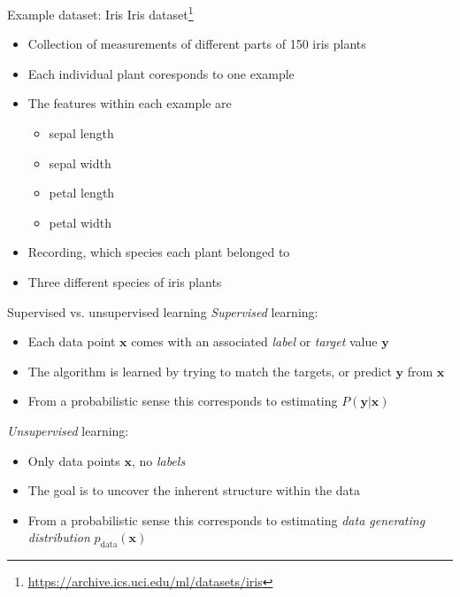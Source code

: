 \documentclass[dvipsnames]{beamer}
\begin{document}
	\def\footnoterule{\only<1->\oldfootnoterule}
	\begin{frame}{Example dataset: Iris}
		Iris dataset\footnote{\url{https://archive.ics.uci.edu/ml/datasets/iris}} \pause
		\begin{itemize}
			\item Collection of measurements of different parts of 150 iris plants\pause
			\item Each individual plant coresponds to one example \pause
			\item The features within each example are\pause
			\begin{itemize}
				\item sepal length
				\item sepal width
				\item petal length
				\item petal width \pause
			\end{itemize}
			\item Recording, which species each plant belonged to \pause
			\item Three different species of iris plants
		\end{itemize}
    \end{frame}
		
		\begin{frame}{Supervised vs. unsupervised learning}
			\emph{Supervised} learning:
			\begin{itemize}
				\item Each data point $\mathbf{x}$ comes with an associated \emph{label} or \emph{target} value $\mathbf{y}$
				\item The algorithm is learned by trying to match the targets, or predict $\mathbf{y}$ from $\mathbf{x}$
				\item From a probabilistic sense this corresponds to estimating $P(\mathbf{y} | \mathbf{x})$
			\end{itemize}
			\pause

			\emph{Unsupervised} learning:
			\begin{itemize}
				\item Only data points $\mathbf{x}$, no \emph{labels}
				\item The goal is to uncover the inherent structure within the data
				\item From a probabilistic sense this corresponds to estimating \emph{data generating distribution} $p_{\text{data}}(\mathbf{x})$
			\end{itemize}
    \end{frame}
		
\end{document}
